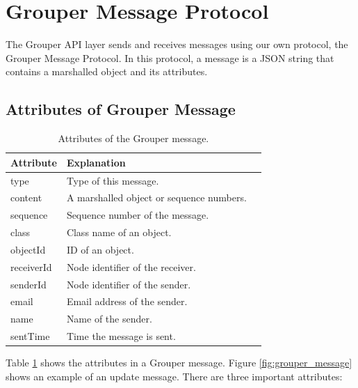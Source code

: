 \documentclass[a4paper,11pt]{report}
\begin{document}
\section{Grouper Message Protocol} \label{section:grouper_message_protocol}

The Grouper API layer sends and receives messages using our own protocol, the Grouper Message Protocol.
In this protocol, a message is a JSON string that contains a marshalled object and its attributes.

\subsection{Attributes of Grouper Message}

\begin{table}[t]
	\centering
	\caption{Attributes of the Grouper message.}
	\label{table:grouper_message_attributes}
	\begin{tabular}{lll}
		\toprule
		\textbf{Attribute} & \textbf{Explanation} \\ 
		\midrule
		type & Type of this message. \\
		content & A marshalled object or sequence numbers. \\
		sequence & Sequence number of the message. \\
		class & Class name of an object. \\
		objectId & ID of an object. \\
		receiverId & Node identifier of the receiver. \\
		senderId & Node identifier of the sender. \\
		email & Email address of the sender. \\
		name & Name of the sender. \\
		sentTime & Time the message is sent. \\
		\bottomrule
	\end{tabular}
\end{table}

Table \ref{table:grouper_message_attributes} shows the attributes in a Grouper message.
Figure \ref{fig:grouper_message} shows an example of an update message.
There are three important attributes:
\end{document}
